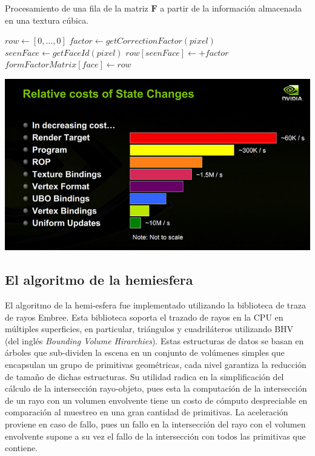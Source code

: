 \begin{algorithm}
\caption{Procesamiento de una fila de la matriz $\mathbf{F}$ a partir de la información almacenada en una textura cúbica.}
\label{alg:processHemicube}
\begin{algorithmic}
			\State $row \gets [0,...,0]$
				\State $factor \gets getCorrectionFactor(pixel)$
				\State $seenFace \gets getFaceId(pixel)$
					\State $row[seenFace] \gets + factor$
				\EndIf
			\EndLoop
			\State $formFactorMatrix[face] \gets  row$
		\EndFunction
\end{algorithmic}
\end{algorithm}

\vspace{5mm}
\begin{minipage}[h]{\linewidth}
	\centering
	\includegraphics[width=0.6\linewidth]{assets/statecosts}
	\label{img:statechangescost}
\end{minipage}

\subsection{El algoritmo de la hemiesfera}
El algoritmo de la hemi-esfera fue implementado utilizando la biblioteca de traza de rayos Embree. Esta biblioteca soporta el trazado de rayos en la CPU en múltiples superficies, en particular, triángulos y cuadriláteros utilizando BHV (del inglés \textit{Bounding Volume Hirarchies}). Estas estructuras de datos se basan en árboles que sub-dividen la escena en un conjunto de volúmenes simples que encapsulan un grupo de primitivas geométricas, cada nivel garantiza la reducción de tamaño de dichas estructuras. Su utilidad radica en la simplificación del cálculo de la intersección rayo-objeto, pues esta la computación de la intersección de un rayo con un volumen envolvente tiene un costo de cómputo despreciable en comparación al muestreo en una gran cantidad de primitivas. La aceleración proviene en caso de fallo, pues un fallo en la intersección del rayo con el volumen envolvente supone a su vez el fallo de la intersección con todos las primitivas que contiene.

